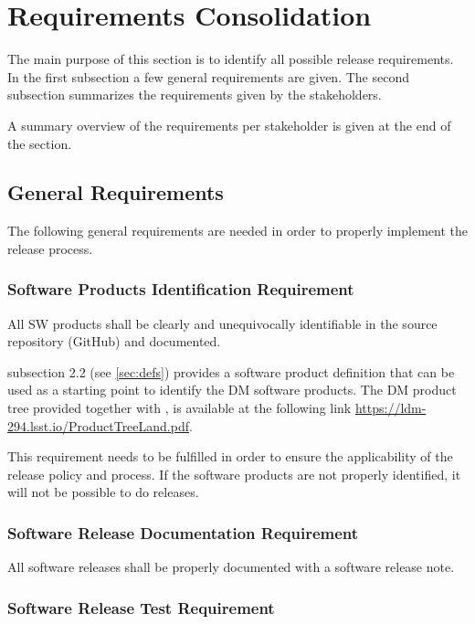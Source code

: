\newpage
\section{Requirements Consolidation} \label{sec:reqdef}

The main purpose of this section is to identify all possible release requirements.
In the first subsection a few general requirements are given.
The second subsection summarizes the requirements given by the stakeholders.

A summary overview of the requirements per stakeholder is given at the end of the section.


\subsection{General Requirements} \label{sec:genreq}

The following general requirements are needed in order to properly implement the release process.


\subsubsection{Software Products Identification Requirement} \label{sec:swid}

All \gls{SW} products shall be clearly and unequivocally identifiable in the source repository (GitHub) and documented.

 subsection 2.2 (see \ref{sec:defs}) provides a software product definition that can be used as a starting point to identify the DM software products.
The DM product tree provided together with , is available at the following link \url{https://ldm-294.lsst.io/ProductTreeLand.pdf}.

This requirement needs to be fulfilled in order to ensure the applicability of the release policy and process.
If the software products are not properly identified, it will not be possible to do releases.


\subsubsection{Software Release Documentation Requirement} \label{sec:reqdoc}

All software releases shall be properly documented with a software release note.


\subsubsection{Software Release Test Requirement} \label{sec:test}


